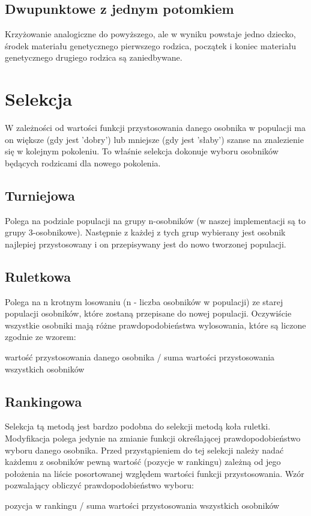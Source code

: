 \documentclass[11pt]{aghdpl}
\begin{document}
\section{Dwupunktowe z jednym potomkiem}
\label{sec:dwaJeden}
Krzyżowanie analogiczne do powyższego, ale w wyniku powstaje jedno dziecko, środek materiału genetycznego pierwszego rodzica, początek i koniec materiału genetycznego drugiego rodzica są zaniedbywane.

\chapter{Selekcja}
\label{cha:selection}
W zależności od wartości funkcji przystosowania danego osobnika w populacji ma on większe (gdy jest 'dobry') lub mniejsze (gdy jest 'słaby') szanse na znalezienie się w kolejnym pokoleniu. To właśnie selekcja dokonuje wyboru osobników będących rodzicami dla nowego pokolenia.
\section{Turniejowa}
\label{sec:tournament}
Polega na podziale populacji na grupy n-osobników (w naszej implementacji są to grupy 3-osobnikowe). Następnie z każdej z tych grup wybierany jest osobnik najlepiej przystosowany i on przepisywany jest do nowo tworzonej populacji.

\section{Ruletkowa}
\label{sec:roulette}
Polega na n krotnym losowaniu (n - liczba osobników w populacji) ze starej populacji osobników, które zostaną przepisane do nowej populacji. Oczywiście wszystkie osobniki mają różne prawdopodobieństwa wylosowania, które są liczone zgodnie ze wzorem:
\begin{center}
wartość przystosowania danego osobnika / suma wartości przystosowania wszystkich osobników
\end{center}
 
\section{Rankingowa}
\label{sec:linear}
Selekcja tą metodą jest bardzo podobna do selekcji metodą koła ruletki. Modyfikacja polega jedynie na zmianie funkcji określającej prawdopodobieństwo wyboru danego osobnika. Przed przystąpieniem do tej selekcji należy nadać każdemu z osobników pewną wartość (pozycje w rankingu) zależną od jego położenia na liście posortowanej względem wartości funkcji przystosowania. Wzór pozwalający obliczyć prawdopodobieństwo wyboru:
\begin{center}
pozycja w rankingu / suma wartości przystosowania wszystkich osobników
\end{center}
\end{document}
